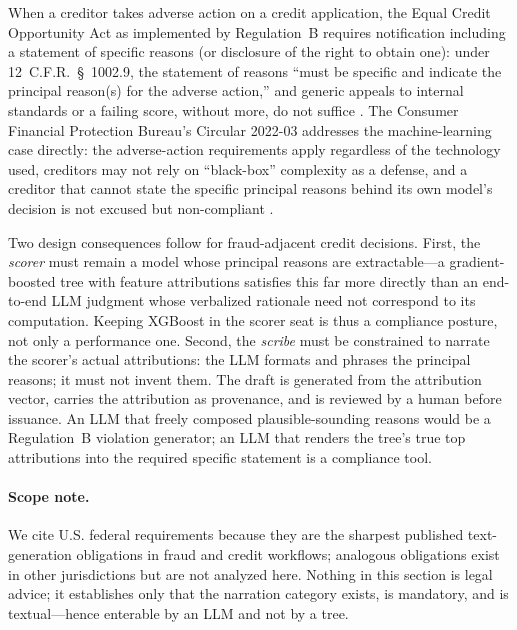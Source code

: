 When a creditor takes adverse action on a credit application, the Equal Credit
Opportunity Act as implemented by Regulation~B requires notification including
a statement of specific reasons (or disclosure of the right to obtain one):
under 12~C.F.R.~\S~1002.9, the statement of reasons ``must be specific and
indicate the principal reason(s) for the adverse action,'' and generic appeals
to internal standards or a failing score, without more, do not suffice
\citep{cfr1002_9}. The Consumer Financial Protection Bureau's Circular
2022-03 addresses the machine-learning case directly: the adverse-action
requirements apply regardless of the technology used, creditors may not rely
on ``black-box'' complexity as a defense, and a creditor that cannot state the
specific principal reasons behind its own model's decision is not excused but
non-compliant \citep{cfpb2022circular}.

Two design consequences follow for fraud-adjacent credit decisions. First, the
\emph{scorer} must remain a model whose principal reasons are extractable---a
gradient-boosted tree with feature attributions satisfies this far more
directly than an end-to-end LLM judgment whose verbalized rationale need not
correspond to its computation. Keeping XGBoost in the scorer seat is thus a
compliance posture, not only a performance one. Second, the \emph{scribe} must
be constrained to narrate the scorer's actual attributions: the LLM formats
and phrases the principal reasons; it must not invent them. The draft is
generated from the attribution vector, carries the attribution as provenance,
and is reviewed by a human before issuance. An LLM that freely composed
plausible-sounding reasons would be a Regulation~B violation generator; an LLM
that renders the tree's true top attributions into the required specific
statement is a compliance tool.

\paragraph{Scope note.} We cite U.S. federal requirements because they are the
sharpest published text-generation obligations in fraud and credit workflows;
analogous obligations exist in other jurisdictions but are not analyzed here.
Nothing in this section is legal advice; it establishes only that the
narration category exists, is mandatory, and is textual---hence enterable by
an LLM and not by a tree.
